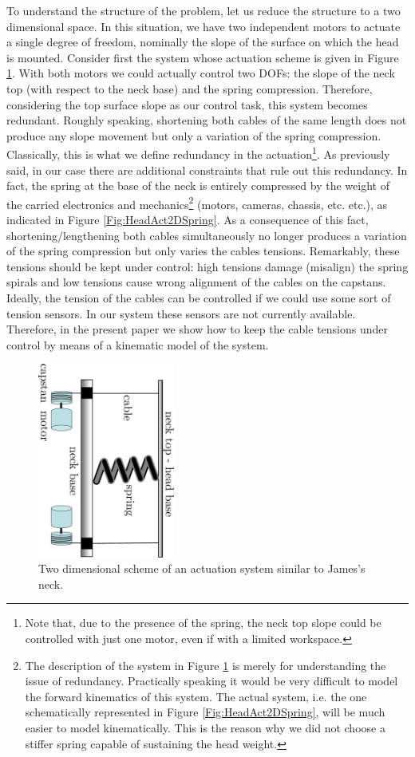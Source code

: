 \documentclass[conference]{IEEEtran}
\numberwithin{equation}{section}
\begin{document}
To understand the structure of the problem, let us reduce the structure to a two dimensional space. In this situation, we have two independent motors to actuate a single degree of freedom, nominally the slope of the surface on which the head is mounted.
Consider first the system whose actuation scheme is given in Figure \ref{Fig:HeadAct2D}. With both motors we could actually control two DOFs: the slope of the neck top (with respect to the neck base) and the spring compression. Therefore, considering the top surface slope as our control task, this system becomes redundant. Roughly speaking, shortening both cables of the same length does not produce any slope movement but only a variation of the spring compression. Classically, this is what we define redundancy in the actuation\footnote{Note that, due to the presence of the spring, the neck top slope could be controlled with just one motor, even if with a limited workspace.}.
As previously said, in our case there are additional constraints that rule out this redundancy. In fact, the spring at the base of the neck is entirely compressed by the weight of the carried electronics and mechanics\footnote{The description of the system in Figure \ref{Fig:HeadAct2D} is merely for understanding the issue of redundancy. Practically speaking it would be very difficult to model the forward kinematics of this system. The actual system, i.e. the one schematically represented in Figure \ref{Fig:HeadAct2DSpring}, will be much easier to model kinematically. This is the reason why we did not choose a stiffer spring capable of sustaining the head weight.} (motors, cameras, chassis, etc. etc.), as indicated in Figure \ref{Fig:HeadAct2DSpring}. As a consequence of this fact, shortening/lengthening both cables simultaneously no longer produces a variation of the spring compression but only varies the cables tensions. Remarkably, these tensions should be kept under control: high tensions damage (misalign) the spring spirals and low tensions cause wrong alignment of the cables on the capstans. Ideally, the tension of the cables can be controlled if we could use some sort of tension sensors. In our system these sensors are not currently available. Therefore, in the present paper we show how to keep the cable tensions under control by means of a kinematic model of the system.

\begin{figure}[tbp]
\centering
\includegraphics[width=45mm, angle=90]{image/Neck2DSpring.pdf} 
\caption{Two dimensional scheme of an actuation system similar to James's neck.}
\label{Fig:HeadAct2D}
\end{figure}
\end{document}
